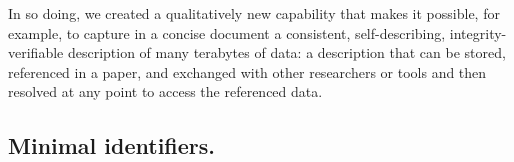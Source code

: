 \documentclass[11pt]{article}
\begin{document}
In so doing, we created a qualitatively new capability that makes it possible, for example, to
capture in a concise document a consistent, self-describing, integrity-verifiable description of many terabytes of data:
a description that can be stored, referenced in a paper, and exchanged with other researchers or tools
and then resolved at any point to access the referenced data.



\subsection{Minimal identifiers.}
\end{document}
